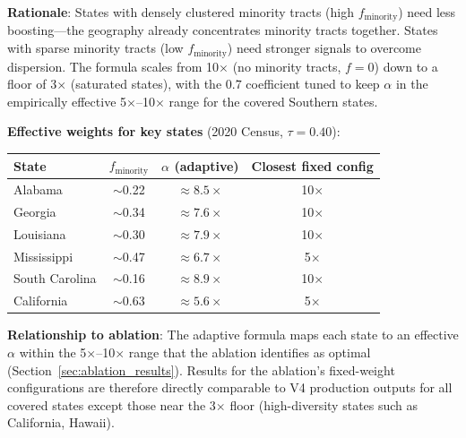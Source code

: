 \textbf{Rationale}: States with densely clustered minority tracts (high $f_{\text{minority}}$) need less boosting---the geography already concentrates minority tracts together. States with sparse minority tracts (low $f_{\text{minority}}$) need stronger signals to overcome dispersion. The formula scales from 10$\times$ (no minority tracts, $f = 0$) down to a floor of 3$\times$ (saturated states), with the $0.7$ coefficient tuned to keep $\alpha$ in the empirically effective 5$\times$--10$\times$ range for the covered Southern states.

\textbf{Effective weights for key states} (2020 Census, $\tau = 0.40$):
\begin{center}
\begin{tabular}{lccc}
\toprule
State & $f_{\text{minority}}$ & $\alpha$ (adaptive) & Closest fixed config \\
\midrule
Alabama      & $\sim$0.22 & $\approx 8.5\times$ & 10$\times$ \\
Georgia      & $\sim$0.34 & $\approx 7.6\times$ & 10$\times$ \\
Louisiana    & $\sim$0.30 & $\approx 7.9\times$ & 10$\times$ \\
Mississippi  & $\sim$0.47 & $\approx 6.7\times$ & 5$\times$ \\
South Carolina & $\sim$0.16 & $\approx 8.9\times$ & 10$\times$ \\
California   & $\sim$0.63 & $\approx 5.6\times$ & 5$\times$ \\
\bottomrule
\end{tabular}
\end{center}

\textbf{Relationship to ablation}: The adaptive formula maps each state to an effective $\alpha$ within the 5$\times$--10$\times$ range that the ablation identifies as optimal (Section~\ref{sec:ablation_results}). Results for the ablation's fixed-weight configurations are therefore directly comparable to V4 production outputs for all covered states except those near the 3$\times$ floor (high-diversity states such as California, Hawaii).

